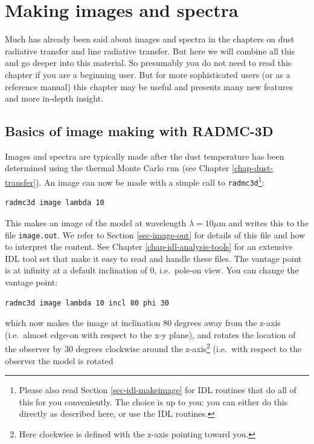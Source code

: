 \documentclass{report}
\newenvironment{asciibox}%
  {\begin{list}{}{%
    \setlength{\topsep}{0.5em}%
    \setlength{\parskip}{0em}%
    \setlength{\parsep}{0em}%
    \setlength{\itemsep}{0em}%
    \setlength{\rightmargin}{0em}%
    \setlength{\leftmargin}{3.0em}%
    \setlength{\labelsep}{1em}%
    \setlength{\labelwidth}{2em}%
  }\normalfont\footnotesize\item}
  {\end{list}}
\begin{document}
\chapter{Making images and spectra}
\label{chap-images-spectra}
%
Much has already been said about images and spectra in the chapters on
dust radiative transfer and line radiative transfer. But here we will
combine all this and go deeper into this material. So presumably you
do not need to read this chapter if you are a beginning user. But for
more sophisticated users (or as a reference manual) this chapter may
be useful and presents many new features and more in-depth insight.

\section{Basics of image making with RADMC-3D}
\label{sec-images}
%
Images and spectra are typically made after the dust temperature has been
determined using the thermal Monte Carlo run (see Chapter \ref{chap-dust-transfer}). An image can now be made with a simple call to
{\small\tt radmc3d}\footnote{Please also read Section \ref{sec-idl-makeimage} for IDL routines that do all of this for you
  conveniently. The choice is up to you: you can either do this directly as
  described here, or use the IDL routines.}:
\begin{asciibox}\begin{verbatim}
radmc3d image lambda 10
\end{verbatim}\end{asciibox}
This makes an image of the model at wavelength $\lambda=10\mu$m and writes
this to the file {\small\tt image.out}. We refer to Section
\ref{sec-image-out} for details of this file and how to interpret the
content. See Chapter \ref{chap-idl-analysis-tools} for an extensive IDL tool
set that make it easy to read and handle these files. The vantage point is
at infinity at a default inclination of 0, i.e.\ pole-on view. You can
change the vantage point:
\begin{asciibox}\begin{verbatim}
radmc3d image lambda 10 incl 80 phi 30
\end{verbatim}\end{asciibox}
which now makes the image at inclination 80 degrees away from the z-axis
(i.e.\ almost edge-on with respect to the x-y plane), and rotates the
location of the observer by 30 degrees clockwise around the
z-axis\footnote{Here clockwise is defined with the z-axis pointing toward
  you.} (i.e.\ with respect to the observer the model is rotated
\end{document}
